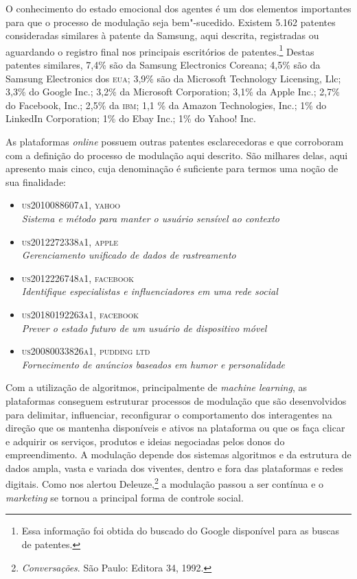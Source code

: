 O conhecimento do estado emocional dos agentes é um dos elementos
importantes para que o processo de modulação seja bem"-sucedido. Existem
5.162 patentes consideradas similares à patente da Samsung, aqui
descrita, registradas ou aguardando o registro final nos principais
escritórios de patentes.\footnote{Essa informação foi obtida do buscado
  do Google disponível para as buscas de patentes.} Destas patentes
similares, 7,4\% são da Samsung Electronics Coreana; 4,5\% são da
Samsung Electronics dos \textsc{eua}; 3,9\% são da Microsoft Technology
Licensing, Llc; 3,3\% do Google Inc.; 3,2\% da Microsoft Corporation;
3,1\% da Apple Inc.; 2,7\% do Facebook, Inc.; 2,5\% da \textsc{ibm}; 1,1 \% da
Amazon Technologies, Inc.; 1\% do LinkedIn Corporation; 1\% do Ebay
Inc.; 1\% do Yahoo! Inc.

As plataformas \textit{online} possuem outras patentes esclarecedoras e que
corroboram com a definição do processo de modulação aqui descrito. São
milhares delas, aqui apresento mais cinco, cuja denominação é suficiente
para termos uma noção de sua finalidade:

\begin{itemize}
\item
  \textsc{us2010088607a1, yahoo}\\
  \textit{Sistema e método para manter o usuário sensível ao contexto}
\item
  \textsc{us2012272338a1, apple}\\
  \textit{Gerenciamento unificado de dados de rastreamento}
\item
  \textsc{us2012226748a1, facebook}\\
  \textit{Identifique especialistas e influenciadores em uma rede social}
\item
  \textsc{us20180192263a1, facebook}\\
  \textit{Prever o estado futuro de um usuário de dispositivo móvel}
\item
  \textsc{us20080033826a1, pudding ltd}\\
  \textit{Fornecimento de anúncios baseados em humor e personalidade}
\end{itemize}

Com a utilização de algoritmos, principalmente de \textit{machine
learning}, as plataformas conseguem estruturar processos de modulação
que são desenvolvidos para delimitar, influenciar, reconfigurar o
comportamento dos interagentes na direção que os mantenha disponíveis e
ativos na plataforma ou que os faça clicar e adquirir os serviços,
produtos e ideias negociadas pelos donos do empreendimento. A modulação
depende dos sistemas algoritmos e da estrutura de dados ampla, vasta e
variada dos viventes, dentro e fora das plataformas e redes digitais.
Como nos alertou Deleuze,\footnote{\textit{Conversações}. São Paulo:
Editora 34, 1992.} a modulação passou a ser contínua e o
\textit{marketing} se tornou a principal forma de controle social.

